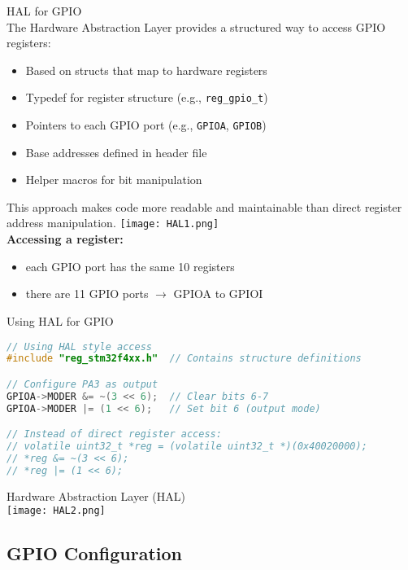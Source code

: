\begin{definition}{HAL for GPIO}\\
The Hardware Abstraction Layer provides a structured way to access GPIO registers:
\begin{itemize}
    \item Based on structs that map to hardware registers
    \item Typedef for register structure (e.g., \texttt{reg\_gpio\_t})
    \item Pointers to each GPIO port (e.g., \texttt{GPIOA}, \texttt{GPIOB})
    \item Base addresses defined in header file
    \item Helper macros for bit manipulation
\end{itemize}
This approach makes code more readable and maintainable than direct register address manipulation.
\texttt{[image: HAL1.png]}\\
    \textbf{Accessing a register:}
    \begin{itemize}
        \item each GPIO port has the same 10 registers 
        \item there are 11 GPIO ports $\rightarrow$ GPIOA to GPIOI
    \end{itemize}
\end{definition}

\begin{code}{Using HAL for GPIO}
\begin{lstlisting}[language=C, style=basesmol] 
// Using HAL style access
#include "reg_stm32f4xx.h"  // Contains structure definitions

// Configure PA3 as output
GPIOA->MODER &= ~(3 << 6);  // Clear bits 6-7
GPIOA->MODER |= (1 << 6);   // Set bit 6 (output mode)

// Instead of direct register access:
// volatile uint32_t *reg = (volatile uint32_t *)(0x40020000);
// *reg &= ~(3 << 6);
// *reg |= (1 << 6);
\end{lstlisting}
\end{code}

\begin{concept}{Hardware Abstraction Layer (HAL)}\\
    \texttt{[image: HAL2.png]}
\end{concept}



\subsection{GPIO Configuration}

